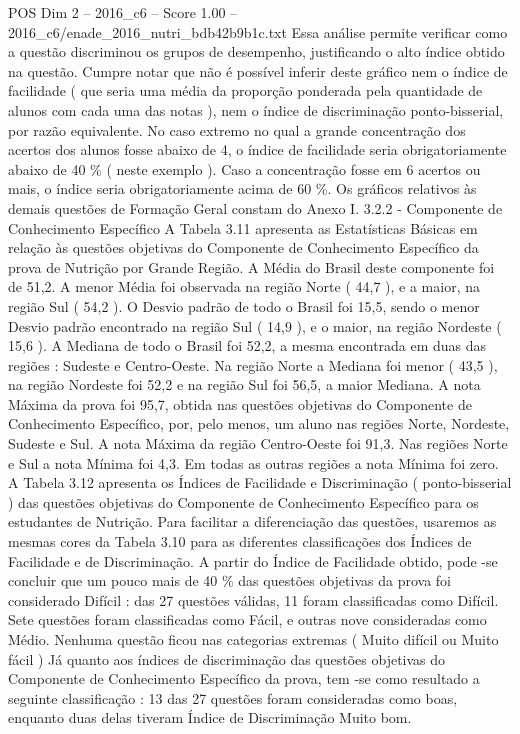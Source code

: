 \begin{textsample}{POS Dim 2 – 2016\_c6 – Score 1.00 – 2016\_c6/enade\_2016\_nutri\_bdb42b9b1c.txt}
Essa análise permite verificar como a questão discriminou os grupos de desempenho, justificando o alto índice obtido na questão.
Cumpre notar que não é possível inferir deste gráfico nem o índice de facilidade ( que seria uma média da proporção ponderada pela quantidade de alunos com cada uma das notas ), nem o índice de discriminação ponto-bisserial, por razão equivalente.
No caso extremo no qual a grande concentração dos acertos dos alunos fosse abaixo de 4, o índice de facilidade seria obrigatoriamente abaixo de 40 \% ( neste exemplo ).
Caso a concentração fosse em 6 acertos ou mais, o índice seria obrigatoriamente acima de 60 \%.
Os gráficos relativos às demais questões de Formação Geral constam do Anexo I. 3.2.2 - Componente de Conhecimento Específico A Tabela 3.11 apresenta as Estatísticas Básicas em relação às questões objetivas do Componente de Conhecimento Específico da prova de Nutrição por Grande Região.
A Média do Brasil deste componente foi de 51,2.
A menor Média foi observada na região Norte ( 44,7 ), e a maior, na região Sul ( 54,2 ).
O Desvio padrão de todo o Brasil foi 15,5, sendo o menor Desvio padrão encontrado na região Sul ( 14,9 ), e o maior, na região Nordeste ( 15,6 ).
A Mediana de todo o Brasil foi 52,2, a mesma encontrada em duas das regiões : Sudeste e Centro-Oeste.
Na região Norte a Mediana foi menor ( 43,5 ), na região Nordeste foi 52,2 e na região Sul foi 56,5, a maior Mediana.
A nota Máxima da prova foi 95,7, obtida nas questões objetivas do Componente de Conhecimento Específico, por, pelo menos, um aluno nas regiões Norte, Nordeste, Sudeste e Sul.
A nota Máxima da região Centro-Oeste foi 91,3.
Nas regiões Norte e Sul a nota Mínima foi 4,3.
Em todas as outras regiões a nota Mínima foi zero.
A Tabela 3.12 apresenta os Índices de Facilidade e Discriminação ( ponto-bisserial ) das questões objetivas do Componente de Conhecimento Específico para os estudantes de Nutrição.
Para facilitar a diferenciação das questões, usaremos as mesmas cores da Tabela 3.10 para as diferentes classificações dos Índices de Facilidade e de Discriminação.
A partir do Índice de Facilidade obtido, pode -se concluir que um pouco mais de 40 \% das questões objetivas da prova foi considerado Difícil : das 27 questões válidas, 11 foram classificadas como Difícil.
Sete questões foram classificadas como Fácil, e outras nove consideradas como Médio.
Nenhuma questão ficou nas categorias extremas ( Muito difícil ou Muito fácil ) Já quanto aos índices de discriminação das questões objetivas do Componente de Conhecimento Específico da prova, tem -se como resultado a seguinte classificação : 13 das 27 questões foram consideradas como boas, enquanto duas delas tiveram Índice de Discriminação Muito bom.

\end{textsample}
